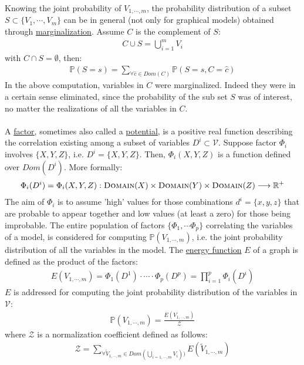 Knowing the joint probability of $V_{1,\cdots,m}$, the probability distribution of a subset $S \subset \lbrace V_1,\cdots,V_m \rbrace$ can be in general (not only for graphical models) obtained through \underline{marginalization}. Assume $C$ is the complement of $S$:
\begin{eqnarray}
C \cup S = \bigcup_{i=1}^{m} V_i
\end{eqnarray}
with $C \cap S = \emptyset$, then:
\begin{eqnarray}
\mathbb{P}(S=s) = \sum _{ \forall \hat{c} \in  Dom(C)} \mathbb{P}(S=s, C=\hat{c})
\label{eq:00:marginalization}
\end{eqnarray}
In the above computation, variables in $C$ were marginalized. Indeed they were in a certain sense eliminated, since the probability of the sub set $S$ was of interest, no matter the realizations of all the variables in $C$.
\\
\\
A \underline{factor}, sometimes also called a \underline{potential}, is a positive real function describing the correlation existing among a subset of variables $D^i \subset \mathcal{V}$. Suppose factor $\Phi _i$ involves $\lbrace {X}, {Y}, {Z} \rbrace$, i.e. $D^i = \lbrace {X}, {Y}, {Z} \rbrace$. Then, $\Phi _i({X}, {Y}, {Z})$ is a function defined over $Dom(D^i)$. More formally:
\begin{eqnarray}
\Phi _i(D^i) = 
\Phi _i(X,Y,Z) : \textsc{Domain}({X}) \times \textsc{Domain}({Y}) \times \textsc{Domain}({Z})  \longrightarrow \mathbb{R}^{+}
\end{eqnarray}
The aim of $\Phi _i$ is to assume 'high' values for those combinations $d^i = \lbrace x , y, z \rbrace$ that are probable to appear together and low values (at least a zero) for those being improbable.
The entire population of factors $\lbrace \Phi _1, \cdots \Phi _p \rbrace$ correlating the variables of a model, is considered for computing $\mathbb{P}({V}_{1,\cdots,m})$, i.e. the joint probability distribution of all the variables in the model. The \underline{energy function} $E$ of a graph is defined as the product of the factors:
\begin{eqnarray}
E({V}_{1,\cdots,m}) = \Phi _1 ( D^1 ) \cdot \cdots \cdot  \Phi _p ( D^p )=  \prod_{i = 1} ^{p} \Phi _i ( D^i ) 
\label{eq:00:energy}
\end{eqnarray}
$E$ is addressed for computing the joint probability distribution of the variables in $\mathcal{V}$:
\begin{eqnarray}
\mathbb{P}({V}_{1,\cdots,m}) =  \frac{ E({V}_{1,\cdots,m}) }{\mathcal{Z}}
\label{eq:00::joint_prob}
\end{eqnarray} 
where $\mathcal{Z}$ is a normalization coefficient defined as follows:
\begin{eqnarray}
\mathcal{Z} = \sum _{\forall \tilde{V}_{1,\cdots,m} \in 
Dom(\bigcup_{i=1,\cdots,m} V_i))} E( \tilde{V}_{1,\cdots,m} )
\end{eqnarray}

